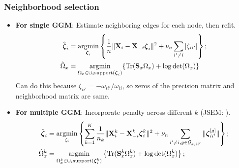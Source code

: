 \documentclass[10pt]{beamer}
\theoremstyle{definition}
\DeclareMathOperator*{\Tr}{Tr}
\DeclareMathOperator*{\argmin}{argmin}
\begin{document}
\begin{frame}
\frametitle{Neighborhood selection}

\begin{itemize}
\item {\bf For single GGM}: Estimate neighboring edges for each node, then refit.
%
\begin{align*}
\hat \bfzeta_i &= \argmin_{\bfzeta_i} \left\{ \frac{1}{n} \| \bfX_i - \bfX_{-i} \bfzeta_i \|^2 + \nu_n \sum_{i' \neq i} |\zeta_{ii'}| \right\};\\
\hat \Omega_x &= \argmin_{\Omega_x \in \cup_i \text{support} (\bfzeta_i)}
\{ \Tr (\bfS_x \Omega_x ) + \log \det(\Omega_x) \}
\end{align*}
%
Can do this because $\zeta_{ii'} = -\omega_{ii'}/\omega_{ii}$, so zeros of the precision matrix and neighborhood matrix are same.

\item {\bf For multiple GGM}: Incorporate penalty across different $k$ (JSEM: \cite{MaMichailidis15}).
%
\begin{align*}
\hat \bfzeta_i &= \argmin_{\zeta_i} \left\{ \sum_{k=1}^K \frac{1}{n_k} \| \bfX_i^k - \bfX_{-i}^k \bfzeta_i^k \|^2 + \nu_n \sum_{i' \neq i, g \in \cG_{x,ii'}} \| \bfzeta_{ii'}^{[g]} \| \right\};\\
\hat \Omega_x^k &= \argmin_{\Omega_x^k \in \cup_i \text{support} (\bfzeta_i^k)}
\left\{ \Tr (\bfS_x^k \Omega_x^k ) + \log \det (\Omega_x^k ) \right\}; \end{align*}
%
\end{itemize}
\end{frame}
\end{document}
